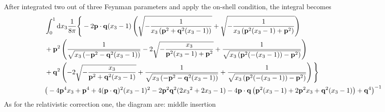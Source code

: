 \documentclass[aps,prd,preprint,showkeys,10pt]{revtex4-1}
\begin{document}
After integrated two out of three Feynman parameters and apply the on-shell condition, the integral becomes
\begin{align*}
	  & \int_0^1\dd x_3\frac{1}{8\pi}\Bigg\{-2 {\vb{p}}\cdot {\vb{q}} ({x_3}-1) \left(\sqrt{-\frac{1}{{x_3} \left({\vb{p}}^2+{\vb{q}}^2 ({x_3}-1)\right)}}+\sqrt{-\frac{1}{{x_3} \left({\vb{p}}^2 ({x_3}-1)+{\vb{p}}^2\right)}}\right)
	\\&+{\vb{p}}^2 \left(\frac{1}{\sqrt{{x_3} \left(-{\vb{p}}^2-{\vb{q}}^2 ({x_3}-1)\right)}}-2 \sqrt{-\frac{{x_3}}{{\vb{p}}^2 ({x_3}-1)+{\vb{p}}^2}}+\frac{1}{\sqrt{{x_3} \left({\vb{p}}^2 (-({x_3}-1))-{\vb{p}}^2\right)}}\right)
	\\&+{\vb{q}}^2 \left(-2 \sqrt{-\frac{{x_3}}{{\vb{p}}^2+{\vb{q}}^2 ({x_3}-1)}}+\frac{1}{\sqrt{{x_3} \left(-{\vb{p}}^2-{\vb{q}}^2 ({x_3}-1)\right)}}+\frac{1}{\sqrt{{x_3} \left({\vb{p}}^2 (-({x_3}-1))-{\vb{p}}^2\right)}}\right)\Bigg\}
	\\&\big(-4 {\vb{p}}^4 {x_3}+{\vb{p}}^4+4 ({\vb{p}}\cdot {\vb{q}})^2 ({x_3}-1)^2 -2 {\vb{p}}^2 {\vb{q}}^2 (2{x_3}^2+2x_3-1) -4 {\vb{p}}\cdot {\vb{q}} \left({\vb{p}}^2 ({x_3}-1)+2 {\vb{p}}^2 {x_3}+{\vb{q}}^2 ({x_3}-1)\right)
	+{\vb{q}}^4\big)^{-1}
\end{align*}
As for the relativistic correction one, the diagram are: middle insertion
\end{document}
